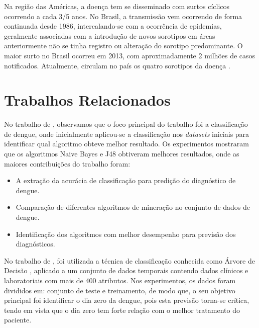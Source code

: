 \documentclass[
	12pt,				%
	openright,			%
	oneside,	
	a4paper,				%
	english,				%
	brazil				%
]{abntex2/abntex2} %
\begin{document}
	Na região das Américas, a doença tem se disseminado com surtos cíclicos ocorrendo a cada 3/5 anos. No Brasil, a transmissão vem ocorrendo de forma continuada desde 1986, intercalando-se com a ocorrência de epidemias, geralmente associadas com a introdução de novos sorotipos em áreas anteriormente não se tinha registro ou alteração do sorotipo predominante. O maior surto no Brasil ocorreu em 2013, com aproximadamente 2 milhões de casos notificados. Atualmente, circulam no país os quatro sorotipos da doença \cite{MS:2015}.
	

	
	\section{Trabalhos Relacionados}	
	
	No trabalho de \cite{shakil:2015}, observamos que o foco principal do trabalho foi a classificação de dengue, onde inicialmente aplicou-se a classificação nos \textit{datasets} iniciais para identificar qual algoritmo obteve melhor resultado. Os experimentos mostraram que os algoritmos Naive Bayes e J48 obtiveram melhores resultados, onde as maiores contribuições do trabalho foram:
	
	\begin{itemize}
		\item A extração da acurácia de classificação para predição do diagnóstico de dengue.
		\item Comparação de diferentes algoritmos de mineração no conjunto de dados de dengue.
		\item Identificação dos algoritmos com melhor desempenho para previsão dos diagnósticos.
	\end{itemize}
	
	No trabalho de \cite{thitiprayoonwongse:2012}, foi utilizada a técnica de classificação conhecida como Árvore de Decisão \cite{tan:2009}, aplicado a um conjunto de dados temporais contendo dados clínicos e laboratoriais com mais de 400 atributos. Nos experimentos, os dados foram divididos em: conjunto de teste e treinamento, de modo que, o seu objetivo principal foi identificar o dia zero da dengue, pois esta previsão torna-se crítica, tendo em vista que o dia zero tem forte relação com o melhor tratamento do paciente.
	
\end{document}
